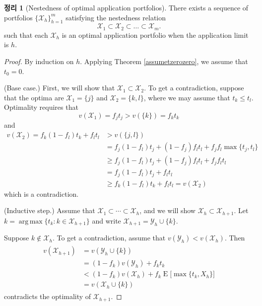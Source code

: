 \documentclass[12pt]{article} %
\DeclareMathOperator*{\argmax}{arg\,max}
\newtheorem{theorem}{Theorem}
\theoremstyle{definition}
\newtheorem{theorem}{정리}
\theoremstyle{definition}
\begin{document}
\begin{theorem}[Nestedness of optimal application portfolios] \label{nestedapplication}
There exists a sequence of portfolios $\{\mathcal{X}_h\}_{h=1}^m$ satisfying the nestedness relation 
\begin{equation}
\mathcal{X}_1 \subset \mathcal{X}_2\subset \dots \subset \mathcal{X}_m.
\end{equation}
such that each $\mathcal{X}_h$ is an optimal application portfolio when the application limit is $h$.
\end{theorem}
\begin{proof} By induction on $h$. Applying Theorem \ref{assumetzerozero}, we assume that $t_0 = 0$. 

(Base case.) First, we will show that $\mathcal{X}_1 \subset \mathcal{X}_2$. To get a contradiction, suppose that the optima are $\mathcal{X}_1 = \{j\}$ and $\mathcal{X}_2 = \{k, l\}$, where we may assume that $t_k \leq t_l$. Optimality requires that
\begin{equation}v(\mathcal{X}_1 )  = f_j t_j > v(\{k\}) = f_k t_k\end{equation}
and
\begin{align}
v(\mathcal{X}_2) =  f_k (1- f_l) t_k + f_l t_l &> v(\{j, l\}) \\
& = f_j (1- f_l) t_j + (1- f_j) f_l t_l + f_j f_l \max\{t_j, t_l\} \\
&\geq  f_j (1- f_l) t_j + (1- f_j) f_l t_l + f_j f_l  t_l \\
&= f_j (1- f_l) t_j + f_l t_l  \\
&\geq f_k (1- f_l) t_k + f_l t_l  = v(\mathcal{X}_2)
\end{align}
which is a contradiction.

(Inductive step.) Assume that $\mathcal{X}_1 \subset \cdots \subset \mathcal{X}_h$, and we will show $\mathcal{X}_h \subset \mathcal{X}_{h+1}$. Let $k = \argmax\{ t_k: k \in \mathcal{X}_{h+1}\}$ and write $\mathcal{X}_{h+1} = \mathcal{Y}_{h} \cup \{k\}$.

Suppose $k \notin \mathcal{X}_h$.  To get a contradiction, assume that $v(\mathcal{Y}_h) < v(\mathcal{X}_h)$. Then
\begin{align}
\begin{split}
v(\mathcal{X}_{h+1})&= v(\mathcal{Y}_{h} \cup \{k\}) \\
&= (1 - f_k) v(\mathcal{Y}_h) + f_k t_k \\
& < (1 - f_k) v(\mathcal{X}_h) + f_k \operatorname{E}\bigl[ \max\{t_k, X_h\}\bigr]\\
&=  v(\mathcal{X}_h\cup \{k\})
\end{split}
\end{align}
contradicts the optimality of $\mathcal{X}_{h+1}$.


\end{proof}
\end{document}
